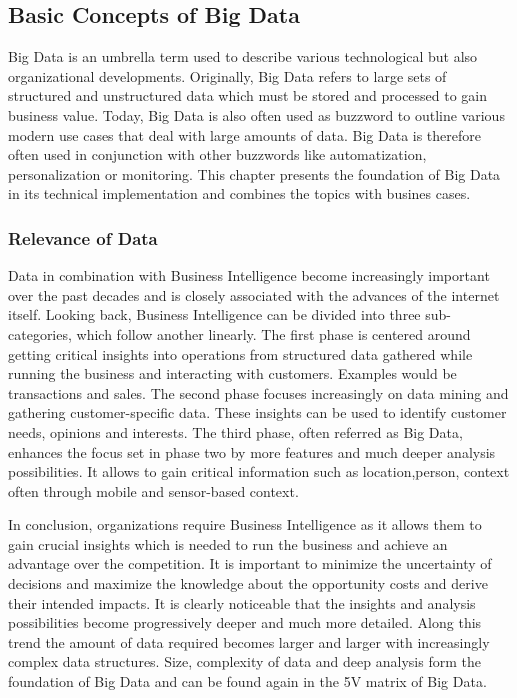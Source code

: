 \subsection{Basic Concepts of Big Data}

Big Data is an umbrella term used to describe various technological but also
organizational developments.
Originally, Big Data refers to large sets of structured and unstructured data
which must be stored and processed to gain business value.
Today, Big Data is also often used as buzzword to outline various modern use cases
that deal with large amounts of data. Big Data is therefore often used in conjunction
with other buzzwords like automatization, personalization or monitoring.
This chapter presents the foundation of Big Data in its technical implementation and
combines the topics with busines cases. 

\subsubsection{Relevance of Data}

Data in combination with Business Intelligence become increasingly important
over the past decades and is closely associated with the advances of the internet
itself.
Looking back, Business Intelligence can be divided into three sub-categories,
which follow another linearly. The first phase is centered around getting critical
insights into operations from structured data gathered while running the business
and interacting with customers. Examples would be transactions and sales.
The second phase focuses increasingly on data mining and gathering customer-specific
data. These insights can be used to identify customer needs, opinions and interests.
The third phase, often referred as Big Data, enhances the focus set in phase
two by more features and much deeper analysis possibilities.
It allows to gain critical information such as location,person,
context often through mobile and sensor-based context. 

In conclusion, organizations require Business Intelligence as it allows them to gain
crucial insights which is needed to run the business and achieve an advantage
over the competition.
It is important to minimize the uncertainty of decisions
and maximize the knowledge about the opportunity costs and derive their intended impacts. 
It is clearly noticeable that the insights and analysis possibilities become
progressively deeper and much more detailed.
Along this trend the amount of data required becomes larger and larger with
increasingly complex data structures. Size, complexity of data and deep analysis
form the foundation of Big Data and can be found again in the 5V matrix of Big Data. 

